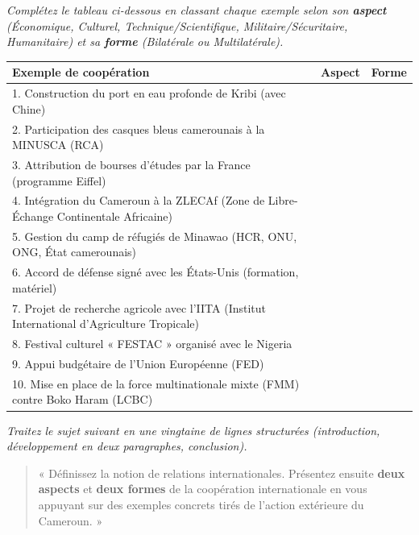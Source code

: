 \documentclass[11pt]{article}
\newcommand{\cle}[1]{{\popxbold\color{popdark}#1}}
\newcounter{popsec}
\newcounter{popsub}
\newcommand{\courssub}[1]{%
  \stepcounter{popsub}%
  \par\vspace{9pt}\noindent{\popxbold\fontsize{11.5}{13}\selectfont\color{popink}{\color{poporange}\thepopsec.\thepopsub}\hspace{6pt}#1}\par\nopagebreak\vspace{4pt}
}
\begin{document}
\begin{exercice}
\emph{Complétez le tableau ci-dessous en classant chaque exemple selon son \textbf{aspect} (Économique, Culturel, Technique/Scientifique, Militaire/Sécuritaire, Humanitaire) et sa \textbf{forme} (Bilatérale ou Multilatérale).}

\begin{center}
\begin{tabularx}{\linewidth}{|l|X|X|}\hline
\textbf{Exemple de coopération} & \textbf{Aspect} & \textbf{Forme} \\ \hline
1. Construction du port en eau profonde de Kribi (avec Chine) & & \\ \hline
2. Participation des casques bleus camerounais à la MINUSCA (RCA) & & \\ \hline
3. Attribution de bourses d'études par la France (programme Eiffel) & & \\ \hline
4. Intégration du Cameroun à la \cle{ZLECAf} (Zone de Libre-Échange Continentale Africaine) & & \\ \hline
5. Gestion du camp de réfugiés de Minawao (HCR, ONU, ONG, État camerounais) & & \\ \hline
6. Accord de défense signé avec les États-Unis (formation, matériel) & & \\ \hline
7. Projet de recherche agricole avec l'IITA (Institut International d'Agriculture Tropicale) & & \\ \hline
8. Festival culturel « FESTAC » organisé avec le Nigeria & & \\ \hline
9. Appui budgétaire de l'Union Européenne (FED) & & \\ \hline
10. Mise en place de la force multinationale mixte (FMM) contre Boko Haram (LCBC) & & \\ \hline
\end{tabularx}
\end{center}
\end{exercice}

\courssub{Je m'entraîne}

\begin{exercice}
\emph{Traitez le sujet suivant en une vingtaine de lignes structurées (introduction, développement en deux paragraphes, conclusion).}
\begin{quote}
« Définissez la notion de \cle{relations internationales}. Présentez ensuite \textbf{deux aspects} et \textbf{deux formes} de la coopération internationale en vous appuyant sur des exemples concrets tirés de l'action extérieure du Cameroun. »
\end{quote}
\end{exercice}
\end{document}
